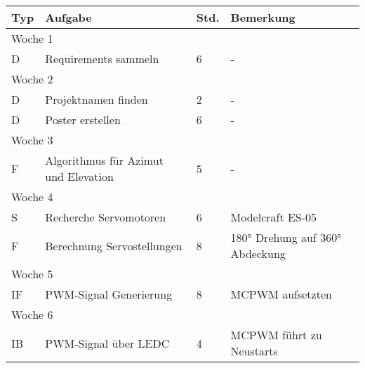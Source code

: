 \vspace{1em}
\begin{table}[!hp]
    \begin{center}
    \begin{tabular}{|l|p{4.5cm}|p{1cm}|p{9cm}|} \hline
        \textbf{Typ} & \textbf{Aufgabe} & \textbf{Std.} & \textbf{Bemerkung} \\ \hline

        \multicolumn{4}{|l|}{Woche 1}                                                                       \\ \hline
        D           &   Requirements sammeln & 6 & -                                                        \\ \hline
        \multicolumn{4}{|l|}{Woche 2}                                                                       \\ \hline
        D           & Projektnamen finden   & 2         & -                                                 \\ \hline
        D           & Poster erstellen      & 6         & -                                                 \\ \hline
        \multicolumn{4}{|l|}{Woche 3}                                                                       \\ \hline
        F           & Algorithmus für Azimut und Elevation & 5 & -                                         \\ \hline
        \multicolumn{4}{|l|}{Woche 4}                                                                       \\ \hline
        S           & Recherche Servomotoren & 6        & Modelcraft ES-05                                  \\ \hline
        F           & Berechnung Servostellungen  & 8   & 180° Drehung auf 360° Abdeckung                   \\ \hline
        \multicolumn{4}{|l|}{Woche 5}                                                                       \\ \hline
        IF           & PWM-Signal Generierung & 8        & MCPWM aufsetzten                                 \\ \hline
        \multicolumn{4}{|l|}{Woche 6}                                                                       \\ \hline
        IB           & PWM-Signal über LEDC  & 4         & MCPWM führt zu Neustarts                         \\ \hline

\end{tabular}
\end{center}
\end{table}
